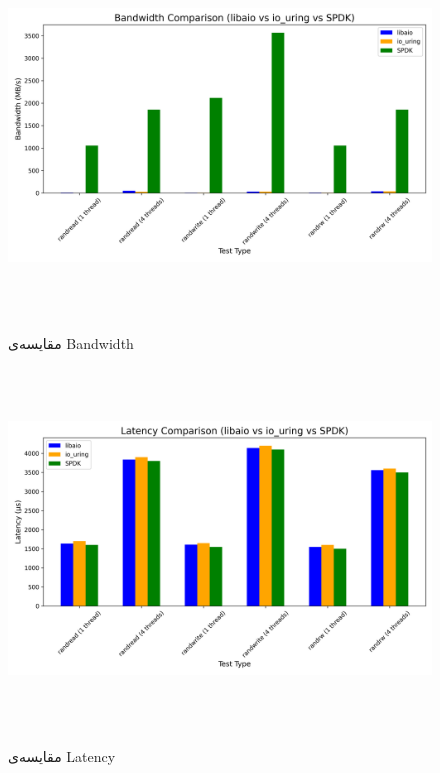 ‫
‫
‫\begin{figure}[H]
‫    \centering
‫    \includegraphics[width=\textwidth]{figs/bandwidth_comparison.png}
‫    \caption{مقایسه‌ی Bandwidth}
‫\end{figure}
‫
‫
‫\begin{figure}[H]
‫    \centering
‫    \includegraphics[width=\textwidth]{figs/latency_comparison.png}
‫    \caption{مقایسه‌ی Latency}
‫\end{figure}
‫
‫
‫
‫